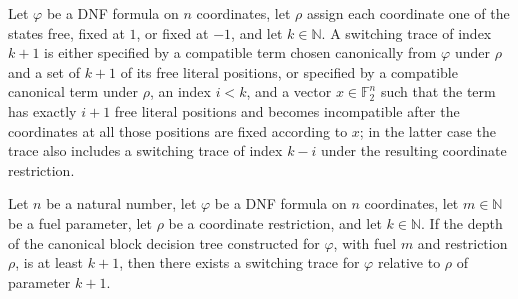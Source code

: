 \begin{definition}
\label{FABL.DNFFormula.SwitchingTrace}
\leanok
{}
Let $\varphi$ be a DNF formula on $n$ coordinates, let $\rho$ assign each coordinate one
of the states free, fixed at $1$, or fixed at $-1$, and let $k\in\mathbb{N}$. A
switching trace of index $k+1$ is either specified by a compatible term chosen
canonically from $\varphi$ under $\rho$ and a set of $k+1$ of its free literal
positions, or specified by a compatible canonical term under $\rho$, an index $i<k$, and
a vector $x\in\mathbb{F}_2^n$ such that the term has exactly $i+1$ free literal
positions and becomes incompatible after the coordinates at all those positions are
fixed according to $x$; in the latter case the trace also includes a switching trace of
index $k-i$ under the resulting coordinate restriction.
\end{definition}

\begin{theorem}
\label{FABL.DNFFormula.nonempty_switchingTrace_of_depth_canonicalBlockTreeAux}
\leanok
{}
Let $n$ be a natural number, let $\varphi$ be a DNF formula on $n$ coordinates, let $m
\in \mathbb{N}$ be a fuel parameter, let $\rho$ be a coordinate restriction, and let $k
\in \mathbb{N}$. If the depth of the canonical block decision tree constructed for
$\varphi$, with fuel $m$ and restriction $\rho$, is at least $k+1$, then there exists a
switching trace for $\varphi$ relative to $\rho$ of parameter $k+1$.
\end{theorem}

